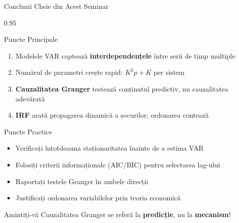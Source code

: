 \documentclass[9pt, aspectratio=169, t]{beamer}
\begin{document}
\begin{frame}{Concluzii Cheie din Acest Seminar}
    \begin{cminipage}{0.95\textwidth}
    {\footnotesize
    \begin{block}{Puncte Principale}
        \begin{enumerate}\setlength{\itemsep}{0pt}
            \item Modelele VAR captează \textbf{interdependențele} între serii de timp multiple
            \item Numărul de parametri crește rapid: $K^2 p + K$ per sistem
            \item \textbf{Cauzalitatea Granger} testează conținutul predictiv, nu cauzalitatea adevărată
            \item \textbf{IRF} arată propagarea dinamică a șocurilor; ordonarea contează
        \end{enumerate}
    \end{block}
    \begin{block}{Puncte Practice}
        \begin{itemize}\setlength{\itemsep}{0pt}
            \item Verificați întotdeauna staționaritatea înainte de a estima VAR
            \item Folosiți criterii informaționale (AIC/BIC) pentru selectarea lag-ului
            \item Raportați testele Granger în ambele direcții
            \item Justificați ordonarea variabilelor prin teoria economică
        \end{itemize}
    \end{block}
    \begin{alertblock}{Amintiți-vă}
        Cauzalitatea Granger se referă la \textbf{predicție}, nu la \textbf{mecanism}!
    \end{alertblock}
    }
    \end{cminipage}
\end{frame}
\end{document}
